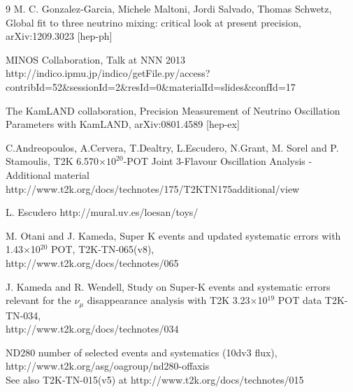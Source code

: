 \begin{thebibliography}{9}
  M. C. Gonzalez-Garcia, Michele Maltoni, Jordi Salvado, Thomas Schwetz,
  Global fit to three neutrino mixing: critical look at present precision,
  arXiv:1209.3023 [hep-ph]

MINOS Collaboration,
Talk at NNN 2013
http://indico.ipmu.jp/indico/getFile.py/access?contribId=52\&sessionId=2\&resId=0\&materialId=slides\&confId=17

  The KamLAND collaboration,
  Precision Measurement of Neutrino Oscillation Parameters with KamLAND,
  arXiv:0801.4589 [hep-ex]





%
%


%
%

%
%

%
%


  C.Andreopoulos, A.Cervera, T.Dealtry, L.Escudero, N.Grant, M. Sorel and P. Stamoulis,
   T2K 6.570$\times10^{20}$-POT Joint 3-Flavour Oscillation Analysis - Additional material
http://www.t2k.org/docs/technotes/175/T2KTN175additional/view

%
%
L. Escudero
http://mural.uv.es/loesan/toys/

%
%

%
%

%
%

%
%


%
%




%
%

  M. Otani and J. Kameda,
  Super K events and updated systematic errors with 1.43$\times$10$^{20}$ POT,
  T2K-TN-065(v8),\\
  http://www.t2k.org/docs/technotes/065
  
  J. Kameda and R. Wendell,
 Study on Super-K events and systematic errors relevant for the $\nu_{\mu}$ disappearance analysis with T2K 3.23$\times$10$^{19}$ POT data
  T2K-TN-034,\\
  http://www.t2k.org/docs/technotes/034

  ND280 number of selected events and systematics (10dv3 flux), \\
  http://www.t2k.org/asg/oagroup/nd280-offaxis \\
  See also T2K-TN-015(v5) at http://www.t2k.org/docs/technotes/015


\end{thebibliography}
